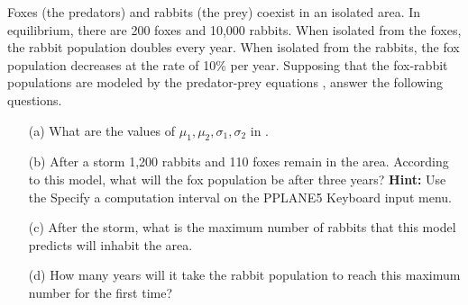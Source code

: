 \documentclass{ximera}
\begin{document}
\begin{exercise} \label{c9.1.8}
Foxes (the predators) and rabbits (the prey) coexist in an isolated area.
In equilibrium, there are 200 foxes and 10,000 rabbits.  When isolated from
the foxes, the rabbit population doubles every year.  When isolated from 
the rabbits, the fox population decreases at the rate of 10\% per year. 
Supposing that the fox-rabbit populations are modeled by the predator-prey
equations , answer the following questions.
\begin{itemize}
\item[(a)]  	What are the values of $\mu_1,\mu_2,\sigma_1,\sigma_2$ in 
.
\item[(b)]	After a storm 1,200 rabbits and 110 foxes remain in the area.
According to this model, what will the fox population be after three years?  
{\bf Hint:}  Use the {\sf Specify a computation interval} on the 
{\sf PPLANE5 Keyboard input} menu.
\item[(c)]	After the storm, what is the maximum number of rabbits that 
this model predicts will inhabit the area.
\item[(d)]	How many years will it take the rabbit population to reach 
this maximum number for the first time?
\end{itemize}
\end{exercise}
\end{document}
